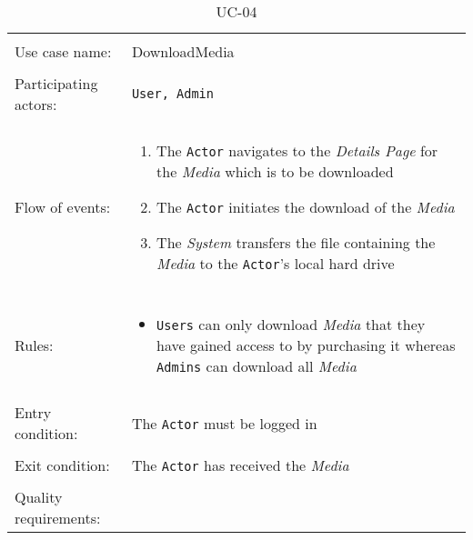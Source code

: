 \documentclass[../report.tex]{subfiles}
\begin{document}
\noindent
\begin{table}
\caption{UC-04}
\label{UC-04}
\begin{tabular}{ l  p{8cm} }   
\hline
\\
Use case name:  & DownloadMedia   \\   \hline    
\\            
Participating actors:  & \texttt{\texttt{User}, \texttt{Admin}} \\   \hline   
\\             
Flow of events: & \begin{enumerate}
\item{The \texttt{Actor} navigates to the \textit{Details Page} for the \textit{Media} which is to be downloaded}
\item{The \texttt{Actor} initiates the download of the \textit{Media}}
\item{The \textit{System} transfers the file containing the \textit{Media} to the \texttt{Actor}'s local hard drive}
\end{enumerate}
\\ \hline
\\
Rules: & \begin{itemize}
\item{\texttt{Users} can only download \textit{Media} that they have gained access to by purchasing it whereas \texttt{Admins} can download all \textit{Media}}
\end{itemize}
\\   \hline 
\\
Entry condition: & The \texttt{Actor} must be logged in \\ \hline
\\
Exit condition: & The \texttt{Actor} has received the \textit{Media} \\ \hline
\\
Quality requirements: &  \\ \hline
\end{tabular}
\end{table}
\end{document}
